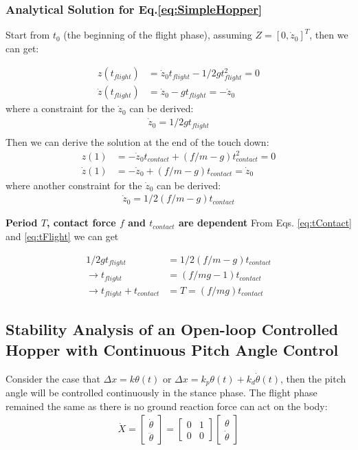 \subsubsection{Analytical Solution for Eq.\ref{eq:SimpleHopper}}
Start from $t_0$ (the beginning of the flight phase), assuming $Z = [0, \dot z_0]^T$, then we can get:

\begin{align}
z(t_{flight}) &= \dot z_0t_{flight} - 1/2gt^2_{flight} = 0\\
\dot z(t_{flight}) &= \dot z_0 - gt_{flight} = -\dot z_0
\end{align}
where a constraint for the $\dot z_0$ can be derived:
\begin{align}
\label{eq:tFlight}
\dot z_0 =  1/2gt_{flight}\\
\end{align}
Then we can derive the solution at the end of the touch down:
\begin{align}
z(1) &= -\dot z_0t_{contact} + (f/m -g)t_{contact}^2 = 0 \\
\dot z(1) &= -\dot z_0 + (f/m -g)t_{contact} = \dot z_0
\end{align}
where another constraint for the $\dot z_0$ can be derived:
\begin{align}
\label{eq:tContact}
\dot z_0 =  1/2(f/m-g)t_{contact}
\end{align}

\noindent \textbf{Period $T$, contact force $f$ and $t_{contact}$ are dependent }
From Eqs. \ref{eq:tContact} and \ref{eq:tFlight} we can get

\begin{align*}
1/2gt_{flight} &=  1/2(f/m-g)t_{contact}\\
\rightarrow t_{flight} &= (f/mg -1) t_{contact}\\
\rightarrow t_{flight} + t_{contact} &= T = (f/mg)t_{contact}
\end{align*}

\pagebreak	


\subsection{Stability Analysis of an Open-loop Controlled Hopper with Continuous Pitch Angle Control}
Consider the case that $\Delta x = k\theta(t)$ or $\Delta x = k_p\theta(t) + k_d\dot\theta(t)$, then the pitch angle will be controlled continuously in the stance phase. The flight phase remained the same as there is no ground reaction force can act on the body: 
\begin{align}
\label{eq:EOM_flight}
\dot X = 
\begin{bmatrix}
\dot \theta  \\
\ddot \theta
\end{bmatrix} = \begin{bmatrix}
0 & 1 \\
0 & 0
\end{bmatrix}\begin{bmatrix}
\theta \\
\dot \theta
\end{bmatrix}
\end{align}

